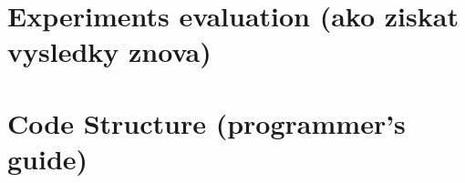 \chapter{Experiments evaluation (ako ziskat vysledky znova)}
\chapter{Code Structure (programmer's guide)}




